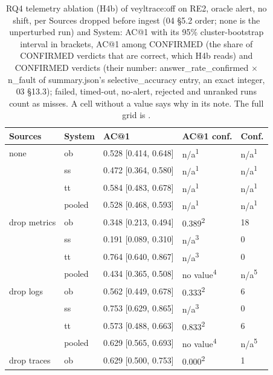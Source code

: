 \begin{table}[t]
\centering
\caption{RQ4 telemetry ablation (H4b) of veyltrace:off on RE2, oracle alert, no shift, per Sources dropped before ingest (04 \S{}5.2 order; none is the unperturbed run) and System: AC@1 with its 95\% cluster-bootstrap interval in brackets, AC@1 among CONFIRMED (the share of CONFIRMED verdicts that are correct, which H4b reads) and CONFIRMED verdicts (their number: answer\_rate\_confirmed $\times$ n\_fault of summary.json's selective\_accuracy entry, an exact integer, 03 \S{}13.3); failed, timed-out, no-alert, rejected and unranked runs count as misses. A cell without a value says why in its note. The full grid is .}
\label{tab:t11-rq4-ablation-paper}
\footnotesize
\setlength{\tabcolsep}{3pt}%
\begin{tabular}{@{}lllll@{}}
\hline
Sources & System & AC@1 & AC@1 conf. & Conf. \\
\hline
none & ob & 0.528 [0.414, 0.648] & n/a\textsuperscript{1} & n/a\textsuperscript{1} \\
 & ss & 0.472 [0.364, 0.580] & n/a\textsuperscript{1} & n/a\textsuperscript{1} \\
 & tt & 0.584 [0.483, 0.678] & n/a\textsuperscript{1} & n/a\textsuperscript{1} \\
 & pooled & 0.528 [0.468, 0.593] & n/a\textsuperscript{1} & n/a\textsuperscript{1} \\
drop metrics & ob & 0.348 [0.213, 0.494] & 0.389\textsuperscript{2} & 18 \\
 & ss & 0.191 [0.089, 0.310] & n/a\textsuperscript{3} & 0 \\
 & tt & 0.764 [0.640, 0.867] & n/a\textsuperscript{3} & 0 \\
 & pooled & 0.434 [0.365, 0.508] & no value\textsuperscript{4} & n/a\textsuperscript{5} \\
drop logs & ob & 0.562 [0.449, 0.678] & 0.333\textsuperscript{2} & 6 \\
 & ss & 0.753 [0.629, 0.865] & n/a\textsuperscript{3} & 0 \\
 & tt & 0.573 [0.488, 0.663] & 0.833\textsuperscript{2} & 6 \\
 & pooled & 0.629 [0.565, 0.693] & no value\textsuperscript{4} & n/a\textsuperscript{5} \\
drop traces & ob & 0.629 [0.500, 0.753] & 0.000\textsuperscript{2} & 1 \\

\end{tabular}
\end{table}
